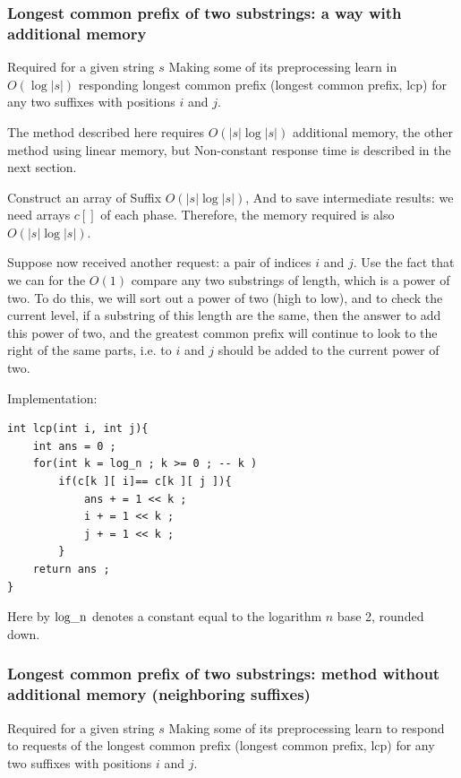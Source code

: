 \subsubsection{ Longest common prefix of two substrings: a way with additional memory }

Required for a given string $s$ Making some of its preprocessing learn in $O (\log | s |)$ responding longest common prefix (longest common prefix, lcp) for any two suffixes with positions $i$ and $j$.

The method described here requires $O (| s | \log | s |)$ additional memory, the other method using linear memory, but Non-constant response time is described in the next section.

Construct an array of Suffix $O (| s | \log | s |)$, And to save intermediate results: we need arrays $c []$ of each phase. Therefore, the memory required is also $O (| s | \log | s |)$.

Suppose now received another request: a pair of indices $i$ and $j$. Use the fact that we can for the $O (1)$ compare any two substrings of length, which is a power of two. To do this, we will sort out a power of two (high to low), and to check the current level, if a substring of this length are the same, then the answer to add this power of two, and the greatest common prefix will continue to look to the right of the same parts, i.e. to $i$ and $j$ should be added to the current power of two.

Implementation:

\begin{verbatim}
int lcp(int i, int j){
    int ans = 0 ;
    for(int k = log_n ; k >= 0 ; -- k )
        if(c[k ][ i]== c[k ][ j ]){
            ans + = 1 << k ;
            i + = 1 << k ;
            j + = 1 << k ;
        }
    return ans ;
} 
\end{verbatim}
Here by $\rm log \_n$ denotes a constant equal to the logarithm $n$ base 2, rounded down.

\subsubsection{ Longest common prefix of two substrings: method without additional memory (neighboring suffixes) }

Required for a given string $s$ Making some of its preprocessing learn to respond to requests of the longest common prefix (longest common prefix, lcp) for any two suffixes with positions $i$ and $j$.

